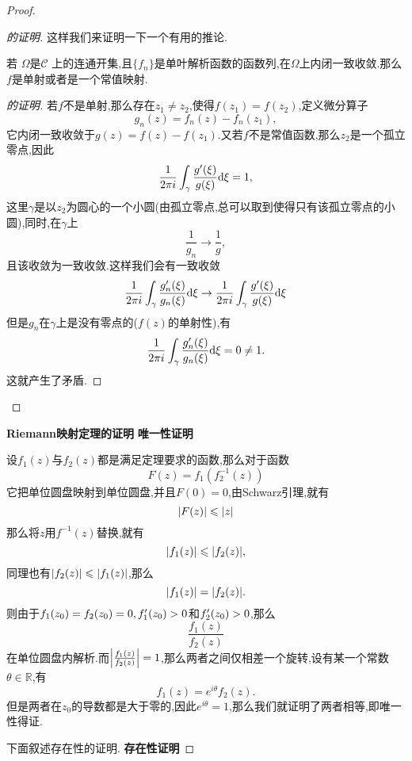 \begin{proof}
\begin{proof}[的证明]
这样我们来证明一下一个有用的推论.
\begin{corollary}[][cor:1]
  若 $\Omega$是$\mathcal{C}$ 上的连通开集,且$\{f_n\}$是单叶解析函数的函数列,在$\Omega$上内闭一致收敛.那么$f$是单射或者是一个常值映射.
\end{corollary}
\begin{proof}[的证明]
  若$f$不是单射,那么存在$z_1\neq z_2$,使得$f(z_1)=f(z_2)$,定义微分算子\[g_n (z)=f_n (z)-f_n (z_1),\]
  它内闭一致收敛于$g(z)=f(z)-f(z_1)$.又若$f$不是常值函数,那么$z_2$是一个孤立零点,因此
  \[
    \frac{1}{2\pi i}\int_{\gamma} \frac{g^\prime (\xi)}{g(\xi)}\dd \xi =1,
  \]
  这里$\gamma$是以$z_2$为圆心的一个小圆(由孤立零点,总可以取到使得只有该孤立零点的小圆),同时,在$\gamma$上
  \[
    \frac{1}{g_n}\to \frac{1}{g},
  \]
  且该收敛为一致收敛.这样我们会有一致收敛
  \[
    \frac{1}{2\pi i}\int_{\gamma} \frac{g_n^\prime (\xi)}{g_n
    (\xi)}\dd \xi \to \frac{1}{2\pi i}\int_{\gamma} \frac{g^\prime (\xi)}{g(\xi)}\dd \xi
  \]
  但是$g_n$在$\gamma$上是没有零点的($f(z)$的单射性),有
  \[
    \frac{1}{2\pi i}\int_{\gamma} \frac{g_n^\prime (\xi)}{g_n (\xi)}\dd \xi=0\neq 1.
  \]
  这就产生了矛盾.
\end{proof}
\end{proof}
\textbf{Riemann映射定理的证明}
\textbf{唯一性证明}


设$f_1(z)$与$f_2 (z)$都是满足定理要求的函数,那么对于函数
\[
  F(z)=f_1 (f_2^{-1}(z))
\]
它把单位圆盘映射到单位圆盘,并且$F(0)=0$,由Schwarz引理,就有
\[
  \abs{F(z)}\leqslant \abs{z}
\]
那么将$z$用$f^{-1}(z)$替换,就有
\[
  \abs{f_1 (z)}\leqslant \abs{f_2 (z)},
\]
同理也有$\abs{f_2 (z)}\leqslant \abs{f_1 (z)}$,那么
\[
  \abs{f_1 (z)}= \abs{f_2 (z)}.
\]
则由于$f_1 (z_0)=f_2 (z_0)=0,f_1^\prime (z_0)>0$和$f_2^\prime (z_0)>0$,那么
\[
  \frac{f_1 (z)}{f_2 (z)}
\]
在单位圆盘内解析.而$\abs{\frac{f_1 (z)}{f_2 (z)}}=1$,那么两者之间仅相差一个旋转,设有某一个常数$\theta\in \mathbb{R}$,有
\[
  f_1 (z)=e^{i\theta}f_2 (z).
\]
但是两者在$z_0$的导数都是大于零的,因此$e^{i\theta}=1$,那么我们就证明了两者相等,即唯一性得证.

下面叙述存在性的证明.
\textbf{存在性证明}


\end{proof}
